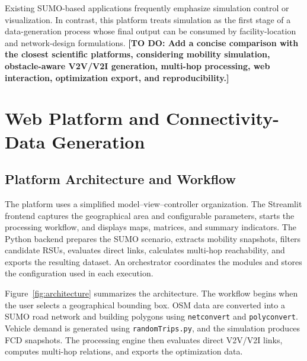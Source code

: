 \documentclass[engproc,proceedingpaper,submit,oneauthor]{Definitions/mdpi}
\newcommand{\todo}[1]{{\color{todored}\textbf{[TO DO: #1]}}}
\begin{document}
Existing SUMO-based applications frequently emphasize simulation control or visualization. In contrast, this platform treats simulation as the first stage of a data-generation process whose final output can be consumed by facility-location and network-design formulations. \todo{Add a concise comparison with the closest scientific platforms, considering mobility simulation, obstacle-aware V2V/V2I generation, multi-hop processing, web interaction, optimization export, and reproducibility.}

\section{Web Platform and Connectivity-Data Generation}\label{sec:method}
\subsection{Platform Architecture and Workflow}
The platform uses a simplified model--view--controller organization. The Streamlit frontend captures the geographical area and configurable parameters, starts the processing workflow, and displays maps, matrices, and summary indicators. The Python backend prepares the SUMO scenario, extracts mobility snapshots, filters candidate RSUs, evaluates direct links, calculates multi-hop reachability, and exports the resulting dataset. An orchestrator coordinates the modules and stores the configuration used in each execution.

Figure~\ref{fig:architecture} summarizes the architecture. The workflow begins when the user selects a geographical bounding box. OSM data are converted into a SUMO road network and building polygons using \texttt{netconvert} and \texttt{polyconvert}. Vehicle demand is generated using \texttt{randomTrips.py}, and the simulation produces FCD snapshots. The processing engine then evaluates direct V2V/V2I links, computes multi-hop relations, and exports the optimization data.
\end{document}
